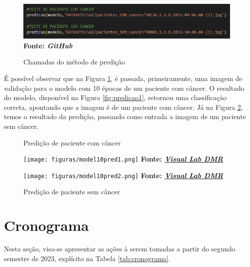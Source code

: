 \begin{figure}[ht]
 	\centering	
 	\caption[\hspace{0.1cm}Grade Computacional.]{Chamadas do método de predição}
 	\vspace{-0.2cm}
 	\includegraphics[width=1\textwidth]{figuras/predicoes.png}
 	\captionsetup{justification=centering}
     \\\textbf{\footnotesize Fonte: \textit{GitHub}}
	\label{fig:predicoes}
\end{figure}

É possível observar que na Figura \ref{fig:predicoes}, é passada, primeiramente, uma imagem de validação para o modelo com 10 épocas de um paciente com câncer. O resultado do modelo, disponível na Figura \ref{fig:predicao1}, retornou uma classificação correta, apontando que a imagem é de um paciente com câncer. Já na Figura \ref{fig:predicao2}, temos o resultado da predição, passando como entrada a imagem de um paciente sem câncer.

\begin{figure}[ht]
\centering
    \begin{minipage}[b]{0.45\textwidth}
        \centering
        \caption{Predição de paciente com câncer}
        \texttt{[image: figuras/model10pred1.png]}
        \label{fig:predicao1}
        \textbf{\footnotesize Fonte: \href{http://visual.ic.uff.br/dmi}{\textit{Visual Lab DMR}}}
    \end{minipage}
    \hfill
    \begin{minipage}[b]{0.45\textwidth}
        \centering
        \caption{Predição de paciente sem câncer}
        \texttt{[image: figuras/model10pred2.png]}
        \label{fig:predicao2}
        \textbf{\footnotesize Fonte: \href{http://visual.ic.uff.br/dmi}{\textit{Visual Lab DMR}}}
    \end{minipage}
\end{figure}


\section{\esp Cronograma} \label{cronograma}

Nesta seção, visa-se apresentar as ações à serem tomadas a partir do segundo semestre de 2023, explícito na Tabela \ref{tab:cronograma}.

